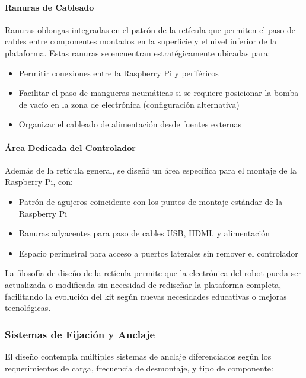 \paragraph{Ranuras de Cableado}
Ranuras oblongas integradas en el patrón de la retícula que permiten el paso de cables entre componentes montados en la superficie y el nivel inferior de la plataforma. Estas ranuras se encuentran estratégicamente ubicadas para:

\begin{itemize}
    \item Permitir conexiones entre la Raspberry Pi y periféricos
    \item Facilitar el paso de mangueras neumáticas si se requiere posicionar la bomba de vacío en la zona de electrónica (configuración alternativa)
    \item Organizar el cableado de alimentación desde fuentes externas
\end{itemize}

\paragraph{Área Dedicada del Controlador}
Además de la retícula general, se diseñó un área específica para el montaje de la Raspberry Pi, con:

\begin{itemize}
    \item Patrón de agujeros coincidente con los puntos de montaje estándar de la Raspberry Pi
    \item Ranuras adyacentes para paso de cables USB, HDMI, y alimentación
    \item Espacio perimetral para acceso a puertos laterales sin remover el controlador
\end{itemize}

La filosofía de diseño de la retícula permite que la electrónica del robot pueda ser actualizada o modificada sin necesidad de rediseñar la plataforma completa, facilitando la evolución del kit según nuevas necesidades educativas o mejoras tecnológicas.

\subsubsection{Sistemas de Fijación y Anclaje}

El diseño contempla múltiples sistemas de anclaje diferenciados según los requerimientos de carga, frecuencia de desmontaje, y tipo de componente:

